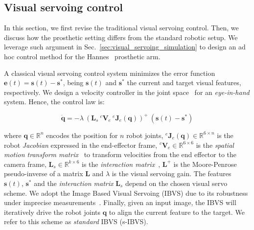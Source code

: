 \subsection{Visual servoing control}
\label{sec:visual_servoing_control}
In this section, we first revise the traditional visual servoing control. 
Then, we discuss how the prosthetic setting differs from the standard robotic setup. We leverage such argument in Sec.~\ref{sec:visual_servoing_simulation} to design an ad hoc control method for the Hannes~\cite{laffranchi2020hannes} prosthetic arm.

 A classical visual servoing control system minimizes the error function $\mathbf{e}(t) = \mathbf{s}(t) - \mathbf{s}^*$,
being $\mathbf{s}(t)$ and $\mathbf{s}^*$ the current and target visual features, respectively. We design a velocity controller in the joint space~\cite{chaumette2007} for an \textit{eye-in-hand} system. 
Hence, the control law is:

\vspace{-0.2cm}
\begin{equation}  \label{eqn:control}
\dot{\mathbf{q}} = - \lambda \: (\mathbf{L}_s \: ^c\mathbf{V}_e \: ^e\mathbf{J}_e(\mathbf{q}))^+ \: (\mathbf{s}(t) - \mathbf{s}^*)
\end{equation}

where $\mathbf{q} \in \mathbb{R}^n$ encodes the position for $n$ robot joints, $^e\mathbf{J}_e(\mathbf{q}) \in \mathbb{R}^{6\times n}$ is the robot \textit{Jacobian} expressed in the end-effector frame, $^c\mathbf{V}_e \in \mathbb{R}^{6\times6}$ is the \textit{spatial motion transform matrix}~\cite{chaumette2006} to transform velocities from the end effector to the camera frame, $\mathbf{L}_s \in \mathbb{R}^{k\times6}$ is the \textit{interaction matrix}~\cite{chaumette2006}, $\mathbf{L}^+$ is the Moore-Penrose pseudo-inverse of a matrix $\mathbf{L}$ and $\lambda$ is the visual servoing gain. The features $\mathbf{s}(t)$, $\mathbf{s}^*$ and the \textit{interaction matrix} $\mathbf{L}_s$ depend on the chosen visual servo scheme.
We adopt the Image Based Visual Servoing (IBVS) due to its robustness under imprecise measurements~\cite{chaumette2006, corke2023}. %
Finally, given an input image, the IBVS will iteratively drive the robot joints $\mathbf{q}$ to align the current feature to the target. We refer to this scheme as \textit{standard} IBVS (s-IBVS).


